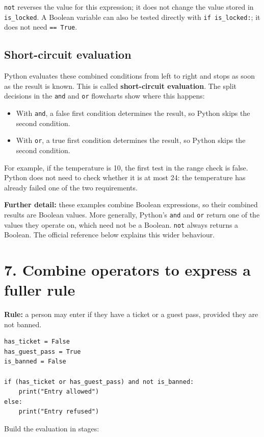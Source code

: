 \documentclass[12pt,a4paper]{article}
\begin{document}
\texttt{not} reverses the value for this expression; it does not change the value stored in \texttt{is\_locked}. A Boolean variable can also be tested directly with \texttt{if is\_locked:}; it does not need \texttt{== True}.

\subsection*{Short-circuit evaluation}
Python evaluates these combined conditions from left to right and stops as soon as the result is known. This is called \textbf{short-circuit evaluation}. The split decisions in the \texttt{and} and \texttt{or} flowcharts show where this happens:

\begin{itemize}
\item With \texttt{and}, a false first condition determines the result, so Python skips the second condition.
\item With \texttt{or}, a true first condition determines the result, so Python skips the second condition.
\end{itemize}
For example, if the temperature is 10, the first test in the range check is false. Python does not need to check whether it is at most 24: the temperature has already failed one of the two requirements.

\textbf{Further detail:} these examples combine Boolean expressions, so their combined results are Boolean values. More generally, Python's \texttt{and} and \texttt{or} return one of the values they operate on, which need not be a Boolean. \texttt{not} always returns a Boolean. The official reference below explains this wider behaviour.

\section*{7. Combine operators to express a fuller rule}
\textbf{Rule:} a person may enter if they have a ticket or a guest pass, provided they are not banned.

\begin{minipage}{\linewidth}
\begin{lstlisting}
has_ticket = False
has_guest_pass = True
is_banned = False

if (has_ticket or has_guest_pass) and not is_banned:
    print("Entry allowed")
else:
    print("Entry refused")
\end{lstlisting}
\end{minipage}
\par
Build the evaluation in stages:
\end{document}
